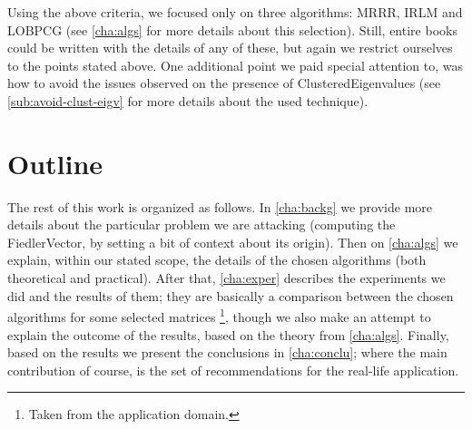 Using the above criteria, we focused only on three algorithms: \gls{MRRR},
\gls{IRLM} and \gls{LOBPCG} (see \cref{cha:algs} for more details
about this selection). Still, entire books could be written with the 
details of any of these, but again we restrict ourselves to the points
stated above. One additional point we paid 
special attention to, was how to avoid the issues observed on the
presence of \gls{ClusteredEigenvalues} (see
\cref{sub:avoid-clust-eigv} for more details about the used
technique). 

\section{Outline}

The rest of this work is organized as follows. In \cref{cha:backg} we
provide more details about the particular problem we are attacking
(computing the \gls{FiedlerVector}, by setting a bit of context about
its origin). Then on \cref{cha:algs} we explain, within
our stated scope, the details of the chosen algorithms (both
theoretical and practical). After that, \cref{cha:exper} describes the
experiments we did and the results of them; they are basically a
comparison between the chosen algorithms for some selected
matrices \footnote{Taken
  from the application domain.}, though we also make an attempt to
explain the outcome of 
the results, based on the theory from \cref{cha:algs}. Finally, based 
on the results we present the conclusions in \cref{cha:conclu}; where
the main contribution of course, is the set of recommendations for the
real-life application.

